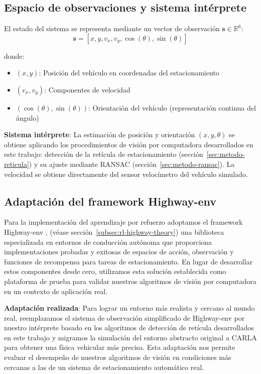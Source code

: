 \subsection{Espacio de observaciones y sistema intérprete}\label{subsec:rl-observations}

El estado del sistema se representa mediante un vector de observación $\mathbf{s} \in \mathbb{R}^6$:
\begin{equation}
    \mathbf{s} = [x, y, v_x, v_y, \cos(\theta), \sin(\theta)]
\end{equation}

donde:
\begin{itemize}
    \item $(x, y)$: Posición del vehículo en coordenadas del estacionamiento
    \item $(v_x, v_y)$: Componentes de velocidad
    \item $(\cos(\theta), \sin(\theta))$: Orientación del vehículo (representación continua del ángulo)
\end{itemize}


\textbf{Sistema intérprete}: La estimación de posición y orientación $(x, y, \theta)$ se obtiene
aplicando los procedimientos de visión por computadora desarrollados en este trabajo:
detección de la retícula de estacionamiento (sección~\ref{sec:metodo-reticula}) y
su ajuste mediante RANSAC (sección~\ref{sec:metodo-ransac}). La velocidad se obtiene
directamente del sensor velocímetro del vehículo simulado.

\subsection{Adaptación del framework Highway-env}\label{subsec:rl-highway-adaptation}

Para la implementación del aprendizaje por refuerzo adoptamos el framework Highway-env \cite{highway-env}, (véase sección~\ref{subsec:rl-highway-theory}) una biblioteca especializada en entornos de conducción autónoma que proporciona implementaciones
probadas y exitosas de espacios de acción, observación y funciones de recompensa para tareas
de estacionamiento. En lugar de desarrollar estos componentes desde cero, utilizamos esta solución 
establecida como plataforma de prueba para validar nuestros algoritmos de visión por computadora 
en un contexto de aplicación real.


\textbf{Adaptación realizada}: Para lograr un entorno más realista y cercano al mundo real, 
reemplazamos el sistema de observación simplificado de Highway-env por nuestro intérprete basado en
los algoritmos de detección de retícula desarrollados en este trabajo y migramos la
simulación del entorno abstracto original a CARLA para obtener una física vehicular
más precisa. Esta adaptación nos permite evaluar el desempeño de nuestros algoritmos de visión 
en condiciones más cercanas a las de un sistema de estacionamiento automático real.


